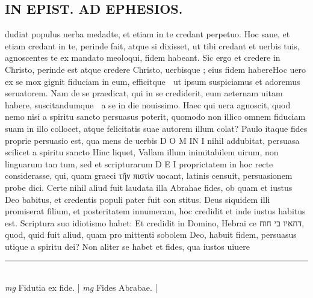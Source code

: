 \documentclass{article}
\begin{document}
\begin{pages}
\section*{IN EPIST. AD EPHESIOS. }\pstart dudiat populus uerba medadte, et etiam in te credant perpetuo. Hoc sane, et etiam credant in te, perinde fait, atque  si dixisset, ut tibi credant et uerbis tuis, agnoscentes te ex mandato meoloqui, fidem habeant. Sic ergo et credere in Christo, perinde est atque credere Christo, uerbisque ; eius fidem habere\pend\pstart Hoc uero ex se mox gignit fiduciam in eum, efficitque  ut ipsum suspiciamus et adoremus seruatorem. Nam de se praedicat, qui in se crediderit, eum aeternam uitam habere, suscitandumque  a se in die nouissimo. Haec qui uera agnoscit, quod nemo nisi a spiritu sancto persuasus poterit, quomodo non illico omnem fiduciam suam in illo collocet, atque felicitatis suae autorem illum colat? Paulo itaque fides proprie persuasio est, qua mens de uerbis D O M IN I nihil addubitat, persuasa scilicet a spiritu sancto Hinc liquet, Vallam illum inimitabilem uirum, non linguarum tan tum, sed et scripturarum D E I proprictatem in hoc recte considerasse, qui, quam graeci τῆν πιστὶν uocant, latinis censuit, persuasionem probe dici.  \pend\pstart Certe nihil aliud fuit laudata illa Abrahae fides, ob quam et iustus Deo babitus, et credentis populi pater fuit con stitus.  Deus siquidem illi promiserat filium, et posteritatem innumeram, hoc credidit et inde iustus habitus est.  Scriptura suo idiotismo habet: Et credidit in Domino, Hebrai ce דחאיו בי חוח, quod, quid fuit aliud, quam pro mittenti sobolem Deo, habuit fidem, persuasus utique a spiritu dei? Non aliter se habet et fides, qua iustos uiuere  \pend
\vspace{0.5cm}\noindent
\vspace{0.2cm}\rule{1cm}{0.2pt}\\ 
\hspace{0.2cm}\textit{mg}
\footnotesize Fidutia ex fide.  
\normalsize| 
\hspace{0.2cm}\textit{mg}
\footnotesize Fides Abrabae.  
\normalsize| 

\end{pages}
\end{document}

